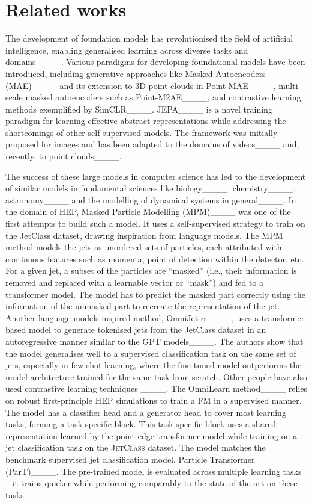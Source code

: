 \section{Related works}
\label{sec:relatedwork}
The development of foundation models has revolutionised the field of artificial intelligence, enabling generalised learning across diverse tasks and domains____. Various paradigms for developing foundational models have been introduced, including generative approaches like Masked Autoencoders (MAE)____ and its extension to 3D point clouds in Point-MAE____, multi-scale masked autoencoders such as Point-M2AE____, and contrastive learning methods exemplified by SimCLR____.  JEPA____ is a novel training paradigm for learning effective abstract representations while addressing the shortcomings of other self-supervised models. The framework was initially proposed for images and has been adapted to the domains of videos____ and, recently, to point clouds____. 

The success of these large models in computer science has led to the development of similar models in fundamental sciences like biology____, chemistry____, astronomy____ and the modelling of dynamical systems in general____. In the domain of HEP, Masked Particle Modelling (MPM)____ was one of the first attempts to build such a model. It uses a self-supervised strategy to train on the JetClass dataset, drawing inspiration from language models. The MPM method models the jets as unordered sets of particles, each attributed with continuous features such as momenta, point of detection within the detector, etc. For a given jet, a subset of the particles are ``masked'' (i.e., their information is removed and replaced with a learnable vector or ``mask'') and fed to a transformer model. The model has to predict the masked part correctly using the information of the unmasked part to recreate the representation of the jet. Another language models-inspired method, OmniJet-$\alpha$____, uses a transformer-based model to generate tokenised jets from the JetClass dataset in an autoregressive manner similar to the GPT models____. The authors show that the model generalises well to a supervised classification task on the same set of jets, especially in few-shot learning, where the fine-tuned model outperforms the model architecture trained for the same task from scratch. Other people have also used contrastive learning techniques ____. The OmniLearn method____ relies on robust first-principle HEP simulations to train a FM in a supervised manner. The model has a classifier head and a generator head to cover most learning tasks, forming a task-specific block. This task-specific block uses a shared representation learned by the point-edge transformer model while training on a jet classification task on the \textsc{JetClass} dataset. The model matches the benchmark supervised jet classification model, Particle Transformer (ParT)____. The pre-trained model is evaluated across multiple learning tasks -- it trains quicker while performing comparably to the state-of-the-art on these tasks. 

